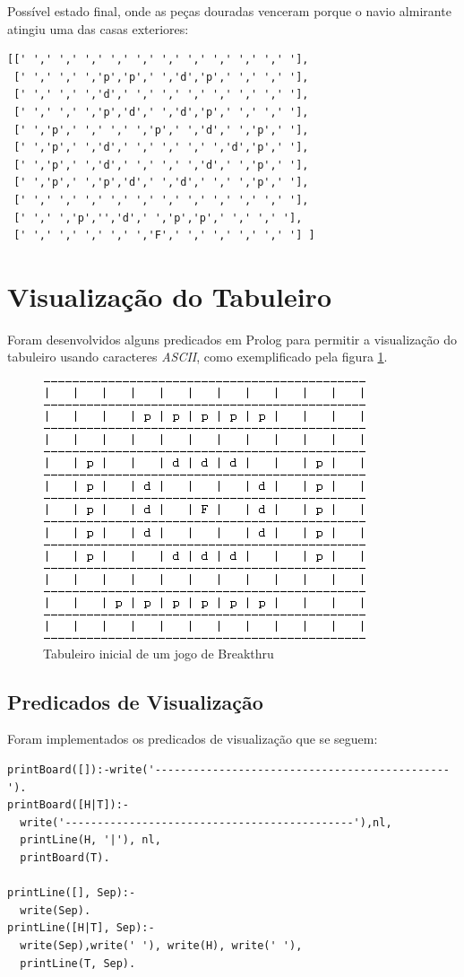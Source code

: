 \documentclass[a4paper]{article}
\begin{document}
Possível estado final, onde as peças douradas venceram porque o navio almirante atingiu uma das casas exteriores:
\begin{verbatim}
[[' ',' ',' ',' ',' ',' ',' ',' ',' ',' ',' '],
 [' ',' ',' ','p','p',' ','d','p',' ',' ',' '],
 [' ',' ',' ','d',' ',' ',' ',' ',' ',' ',' '],
 [' ',' ',' ','p','d',' ','d','p',' ',' ',' '],
 [' ','p',' ',' ',' ','p',' ','d',' ','p',' '],
 [' ','p',' ','d',' ',' ',' ',' ','d','p',' '],
 [' ','p',' ','d',' ',' ',' ','d',' ','p',' '],
 [' ','p',' ','p','d',' ','d',' ',' ','p',' '],
 [' ',' ',' ',' ',' ',' ',' ',' ',' ',' ',' '],
 [' ',' ','p','','d',' ','p','p',' ',' ',' '],
 [' ',' ',' ',' ',' ','F',' ',' ',' ',' ',' '] ] 
\end{verbatim}


\section{Visualização do Tabuleiro}

Foram desenvolvidos alguns predicados em Prolog para permitir a visualização do tabuleiro usando caracteres \textit{ASCII}, como exemplificado pela figura \ref{fig:example}.
\begin{figure}
\centering
\includegraphics[scale=1]{Breakthru_initial_sicstus.png}
\caption{Tabuleiro inicial de um jogo de Breakthru}
\label{fig:example}
\end{figure}

\subsection{Predicados de Visualização}
Foram implementados os predicados de visualização que se seguem:

\begin{verbatim}
printBoard([]):-write('----------------------------------------------').
printBoard([H|T]):-
  write('---------------------------------------------'),nl,
  printLine(H, '|'), nl,
  printBoard(T).

printLine([], Sep):-
  write(Sep).
printLine([H|T], Sep):-
  write(Sep),write(' '), write(H), write(' '),
  printLine(T, Sep).
\end{verbatim}
\end{document}
